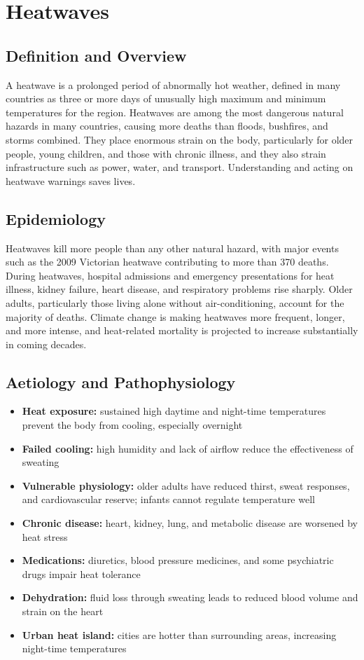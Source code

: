 \chapter{Heatwaves}

\section*{Definition and Overview}
A heatwave is a prolonged period of abnormally hot weather, defined in many countries as three or more days of unusually high maximum and minimum temperatures for the region. Heatwaves are among the most dangerous natural hazards in many countries, causing more deaths than floods, bushfires, and storms combined. They place enormous strain on the body, particularly for older people, young children, and those with chronic illness, and they also strain infrastructure such as power, water, and transport. Understanding and acting on heatwave warnings saves lives.

\section*{Epidemiology}
Heatwaves kill more people than any other natural hazard, with major events such as the 2009 Victorian heatwave contributing to more than 370 deaths. During heatwaves, hospital admissions and emergency presentations for heat illness, kidney failure, heart disease, and respiratory problems rise sharply. Older adults, particularly those living alone without air-conditioning, account for the majority of deaths. Climate change is making heatwaves more frequent, longer, and more intense, and heat-related mortality is projected to increase substantially in coming decades.

\section*{Aetiology and Pathophysiology}
\begin{itemize}
    \item \textbf{Heat exposure:} sustained high daytime and night-time temperatures prevent the body from cooling, especially overnight
    \item \textbf{Failed cooling:} high humidity and lack of airflow reduce the effectiveness of sweating
    \item \textbf{Vulnerable physiology:} older adults have reduced thirst, sweat responses, and cardiovascular reserve; infants cannot regulate temperature well
    \item \textbf{Chronic disease:} heart, kidney, lung, and metabolic disease are worsened by heat stress
    \item \textbf{Medications:} diuretics, blood pressure medicines, and some psychiatric drugs impair heat tolerance
    \item \textbf{Dehydration:} fluid loss through sweating leads to reduced blood volume and strain on the heart
    \item \textbf{Urban heat island:} cities are hotter than surrounding areas, increasing night-time temperatures
\end{itemize}

